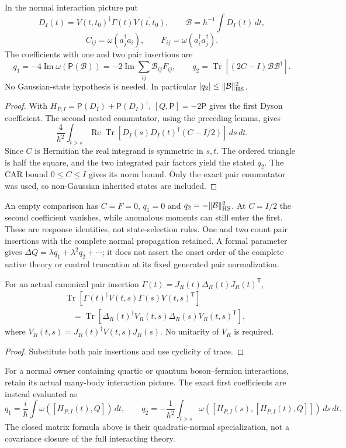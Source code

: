 \documentclass[12pt,a4paper]{article}
\begin{document}
\begin{theorem}
\label{p4:thm:v2167-inherited-pair-coefficients}
In the normal interaction picture put
\[
 D_I(t)=V(t,t_0)^\dagger\Gamma(t)\overline{V(t,t_0)},\qquad
 \mathcal B=\hbar^{-1}\int D_I(t)\,dt,
\]
\[
 C_{ij}=\omega(a_j^\dagger a_i),\qquad
 F_{ij}=\omega(a_i^\dagger a_j^\dagger).
\]
The coefficients with one and two pair insertions are
\[
 \boxed{q_1=-4\operatorname{Im}\omega(\mathsf P(\mathcal B))
 =-2\operatorname{Im}\sum_{ij}\mathcal B_{ij}F_{ij},}
 \qquad
 \boxed{q_2=\operatorname{Tr}[(2C-I)\mathcal B\mathcal B^\dagger].}
\]
No Gaussian-state hypothesis is needed. In particular
$|q_2|\le\|\mathcal B\|_{\rm HS}^2$.
\end{theorem}
\begin{proof}
With $H_{P,I}=\mathsf P(D_I)+\mathsf P(D_I)^\dagger$,
$[Q,\mathsf P]=-2\mathsf P$ gives the first Dyson coefficient.
The second nested commutator, using the preceding lemma, gives
\[
 \frac4{\hbar^2}\int_{t>s}
 \operatorname{Re}\operatorname{Tr}
 [D_I(s)D_I(t)^\dagger(C-I/2)]\,ds\,dt.
\]
Since $C$ is Hermitian the real integrand is symmetric in $s,t$.
The ordered triangle is half the square, and the two integrated pair
factors yield the stated $q_2$. The CAR bound $0\le C\le I$ gives its norm
bound. Only the exact pair commutator was used, so non-Gaussian inherited
states are included.
\end{proof}
An empty comparison has $C=F=0$, $q_1=0$ and
$q_2=-\|\mathcal B\|_{\rm HS}^2$. At $C=I/2$ the second coefficient
vanishes, while anomalous moments can still enter the first. These are
response identities, not state-selection rules.
One and two count pair insertions with the complete normal propagation
retained. A formal parameter gives
$\Delta Q=\lambda q_1+\lambda^2q_2+\cdots$; it does not assert the onset
order of the complete native theory or control truncation at its fixed
generated pair normalization.

\begin{corollary}
\label{p4:cor:v2167-returned-pair-kernel}
For an actual canonical pair insertion
$\Gamma(t)=J_R(t)\Delta_R(t)J_R(t)^{\mathsf T}$,
\[
 \begin{aligned}
 &\operatorname{Tr}[\Gamma(t)^\dagger V(t,s)\Gamma(s)V(t,s)^{\mathsf T}]\\
 &\quad=\operatorname{Tr}[\Delta_R(t)^\dagger V_R(t,s)
             \Delta_R(s)V_R(t,s)^{\mathsf T}],
 \end{aligned}
\]
where $V_R(t,s)=J_R(t)^\dagger V(t,s)J_R(s)$. No unitarity of $V_R$ is
required.
\end{corollary}
\begin{proof}
Substitute both pair insertions and use cyclicity of trace.
\end{proof}
For a normal owner containing quartic or quantum boson--fermion
interactions, retain its actual many-body interaction picture. The exact
first coefficients are instead evaluated as
\[
 q_1=\frac i\hbar\int\omega([H_{P,I}(t),Q])\,dt,
 \qquad
 q_2=-\frac1{\hbar^2}\int_{t>s}
 \omega([H_{P,I}(s),[H_{P,I}(t),Q]])\,ds\,dt.
\]
The closed matrix formula above is their quadratic-normal specialization,
not a covariance closure of the full interacting theory.
\end{document}
